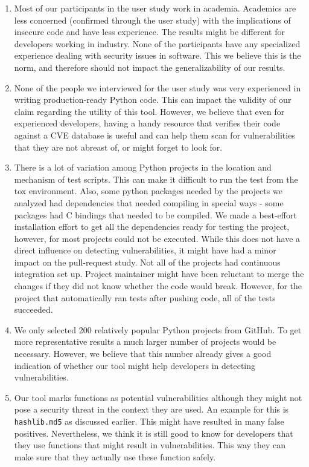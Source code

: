\begin{enumerate}
\item Most of our participants in the user study work in academia. Academics are less concerned (confirmed through the user study) with the implications of insecure code and have less experience. The results might be different for developers working in industry. None of the participants have any specialized experience dealing with security issues in software. This we believe this is the norm, and therefore should not impact the generalizability of our results. 

\item None of the people we interviewed for the user study was very experienced in writing production-ready Python code. This can impact the validity of our claim regarding the utility of this tool. However, we believe that even for experienced developers, having a handy resource that verifies their code against a CVE database is useful and can help them scan for vulnerabilities that they are not abreast of, or might forget to look for. 

\item There is a lot of variation among Python projects in the location and mechanism of test scripts. This can make it difficult to run the test from the tox environment. Also, some python packages needed by the projects we analyzed had dependencies that needed compiling in special ways - some packages had C bindings that needed to be compiled. We made a best-effort installation effort to get all the dependencies ready for testing the project, however, for most projects could not be executed. While this does not have a direct influence on detecting vulnerabilities, it might have had a minor impact on the pull-request study. Not all of the projects had continuous integration set up. Project maintainer might have been reluctant to merge the changes if they did not know whether the code would break. However, for the project that automatically ran tests after pushing code, all of the tests succeeded. 

\item We only selected 200 relatively popular Python projects from GitHub. To get more representative results a much larger number of projects would be necessary. However, we believe that this number already gives a good indication of whether our tool might help developers in detecting vulnerabilities.

\item Our tool marks functions as potential vulnerabilities although they might not pose a security threat in the context they are used. An example for this is \texttt{hashlib.md5} as discussed earlier. This might have resulted in many false positives. Nevertheless, we think it is still good to know for developers that they use functions that might result in vulnerabilities. This way they can make sure that they actually use these function safely.
\end{enumerate}
